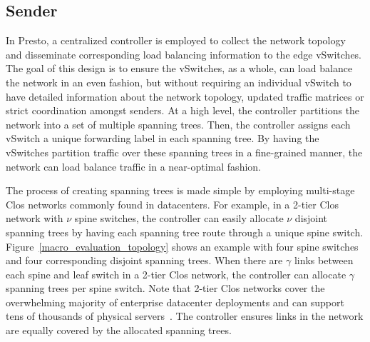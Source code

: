 \subsection{Sender}


In Presto, a centralized controller is employed to collect the
network topology and disseminate corresponding load balancing information to the edge vSwitches. 
The goal of this design is to ensure the vSwitches, as a whole, can load balance the network
in an even fashion, but without requiring an individual vSwitch to have detailed information
about the network topology, updated traffic matrices or strict coordination amongst senders.
 At a high level, the controller partitions
the network into a set of multiple spanning trees. Then, the controller
assigns each vSwitch a unique forwarding label in each spanning tree.
By having the vSwitches partition traffic over these spanning trees in a fine-grained
manner, the network can load balance traffic in a near-optimal fashion.

The process of creating spanning trees is made simple by employing multi-stage Clos
networks commonly found in datacenters. For example, in a 2-tier Clos network
with $\nu$ spine switches, the controller can easily allocate $\nu$ disjoint spanning
trees by having each spanning tree route through a unique spine switch. Figure~\ref{macro_evaluation_topology}
shows an example with four spine switches and four corresponding disjoint spanning trees.
When there are $\gamma$ links between each spine and leaf switch in a 2-tier Clos network,
the controller can allocate $\gamma$ spanning trees per spine switch.
Note that 2-tier Clos networks cover the overwhelming 
majority of enterprise datacenter deployments and can
support tens of thousands of physical servers~\cite{conga}.
The controller ensures links in the network are equally covered
by the allocated spanning trees.

